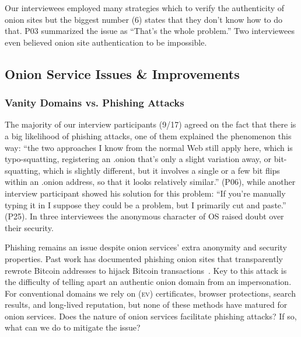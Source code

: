 Our interviewees employed many strategies which to verify the authenticity of
onion sites but the biggest number (6) states that they don't know how to do
that.  P03 summarized the issue as ``That's the whole problem.'' Two
interviewees even believed onion site authentication to be impossible.

\subsection{Onion Service Issues \& Improvements}
\label{sec:improve}

\subsubsection{Vanity Domains vs. Phishing Attacks}

The majority of our interview participants (9/17) agreed on the fact that there
is a big likelihood of phishing attacks, one of them explained the phenomenon
this way: ``the two approaches I know from the normal Web still apply here,
which is typo-squatting, registering an .onion that's only a slight variation
away, or bit-squatting, which is slightly different, but it involves a single or
a few bit flips within an .onion address, so that it looks relatively similar.''
(P06), while another interview participant showed his solution for this problem:
``If you're manually typing it in I suppose they could be a problem, but I
primarily cut and paste.'' (P25). In three interviewees the anonymous character
of OS raised doubt over their security.

Phishing remains an issue despite onion services' extra anonymity and security
properties.  Past work has documented phishing onion sites that transparently
rewrote Bitcoin addresses to hijack Bitcoin
transactions~\cite{Winter2016a,Nurmi2015a,Monteiro2016a}.  Key to this attack is
the difficulty of telling apart an authentic onion domain from an impersonation.
For conventional domains we rely on (\textsc{ev}) certificates, browser
protections, search results, and long-lived reputation, but none of these
methods have matured for onion services.  Does the nature of onion services
facilitate phishing attacks?  If so, what can we do to mitigate the issue?

